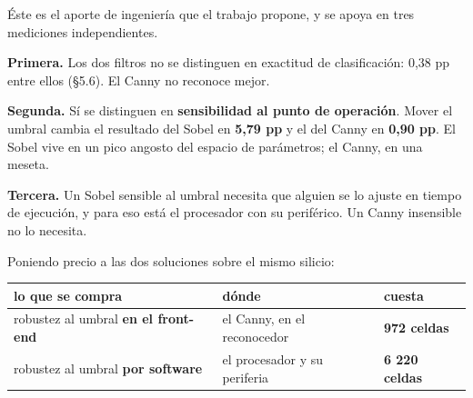 Éste es el aporte de ingeniería que el trabajo propone, y se apoya en
tres mediciones independientes.

\textbf{Primera.} Los dos filtros no se distinguen en exactitud de
clasificación: 0,38 pp entre ellos (§5.6). El Canny no reconoce mejor.

\textbf{Segunda.} Sí se distinguen en \textbf{sensibilidad al punto de
operación}. Mover el umbral cambia el resultado del Sobel en
\textbf{5,79 pp} y el del Canny en \textbf{0,90 pp}. El Sobel vive en un
pico angosto del espacio de parámetros; el Canny, en una meseta.

\textbf{Tercera.} Un Sobel sensible al umbral necesita que alguien se lo
ajuste en tiempo de ejecución, y para eso está el procesador con su
periférico. Un Canny insensible no lo necesita.

Poniendo precio a las dos soluciones sobre el mismo silicio:

\begin{longtable}[]{@{}
  >{\raggedright\arraybackslash}p{}
  >{\raggedright\arraybackslash}p{}
  >{\raggedleft\arraybackslash}p{}@{}}
\toprule\noalign{}
\begin{minipage}[b]{\linewidth}\raggedright
lo que se compra
\end{minipage} & \begin{minipage}[b]{\linewidth}\raggedright
dónde
\end{minipage} & \begin{minipage}[b]{\linewidth}\raggedleft
cuesta
\end{minipage} \\
\midrule\noalign{}
\endhead
\bottomrule\noalign{}
\endlastfoot
robustez al umbral \textbf{en el front-end} & el Canny, en el
reconocedor & \textbf{972 celdas} \\
robustez al umbral \textbf{por software} & el procesador y su periferia
& \textbf{6 220 celdas} \\
\end{longtable}

